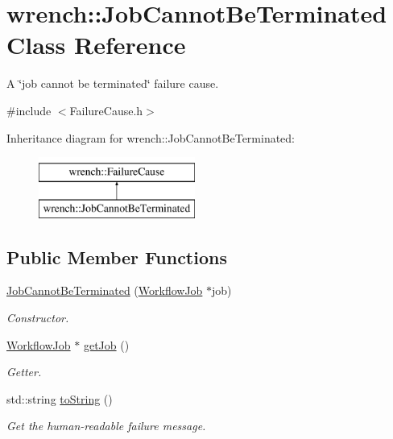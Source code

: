 \hypertarget{classwrench_1_1_job_cannot_be_terminated}{}\section{wrench\+:\+:Job\+Cannot\+Be\+Terminated Class Reference}
\label{classwrench_1_1_job_cannot_be_terminated}


A \char`\"{}job cannot be terminated\char`\"{} failure cause.  




{\ttfamily \#include $<$Failure\+Cause.\+h$>$}

Inheritance diagram for wrench\+:\+:Job\+Cannot\+Be\+Terminated\+:\begin{figure}[H]
\begin{center}
\leavevmode
\includegraphics[height=2.000000cm]{classwrench_1_1_job_cannot_be_terminated}
\end{center}
\end{figure}
\subsection*{Public Member Functions}
\begin{DoxyCompactItemize}
\item 
\hyperlink{classwrench_1_1_job_cannot_be_terminated_a429e5ff2482d19fc013ea2453307a82b}{Job\+Cannot\+Be\+Terminated} (\hyperlink{classwrench_1_1_workflow_job}{Workflow\+Job} $\ast$job)
\begin{DoxyCompactList}\small\item\em Constructor. \end{DoxyCompactList}\item 
\hyperlink{classwrench_1_1_workflow_job}{Workflow\+Job} $\ast$ \hyperlink{classwrench_1_1_job_cannot_be_terminated_af97232722e1b4feed0c12b9e0ced666f}{get\+Job} ()
\begin{DoxyCompactList}\small\item\em Getter. \end{DoxyCompactList}\item 
std\+::string \hyperlink{classwrench_1_1_job_cannot_be_terminated_acfa2b83db93bb68e0e773cc8b4a45505}{to\+String} ()
\begin{DoxyCompactList}\small\item\em Get the human-\/readable failure message. \end{DoxyCompactList}\end{DoxyCompactItemize}
